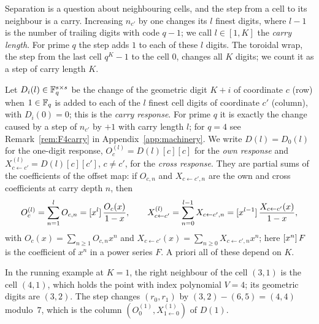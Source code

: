 Separation is a question about neighbouring cells, and the step from a cell to its neighbour is a carry. Increasing $n_{c'}$ by one changes its $l$ finest digits, where $l-1$ is the number of trailing digits with code $q-1$; we call $l\in[1,K]$ the \emph{carry length}. For prime $q$ the step adds $1$ to each of these $l$ digits. The toroidal wrap, the step from the last cell $q^K-1$ to the cell $0$, changes all $K$ digits; we count it as a step of carry length $K$.

Let $D_i(l)\in\mathbb{F}_q^{s\times s}$ be the change of the geometric digit $K+i$ of coordinate $c$ (row) when $1\in\mathbb{F}_q$ is added to each of the $l$ finest cell digits of coordinate $c'$ (column), with $D_i(0)=0$; this is the \emph{carry response}. For prime $q$ it is exactly the change caused by a step of $n_{c'}$ by $+1$ with carry length $l$; for $q=4$ see Remark~\ref{rem:F4carry} in Appendix~\ref{app:machinery}. We write $D(l)=D_0(l)$ for the one-digit response, $O_c^{(l)}=D(l)[c][c]$ for the \emph{own response} and $X_{c\leftarrow c'}^{(l)}=D(l)[c][c']$, $c\ne c'$, for the \emph{cross response}. They are partial sums of the coefficients of the offset map: if $O_{c,n}$ and $X_{c\leftarrow c',n}$ are the own and cross coefficients at carry depth $n$, then
\[
O_c^{(l)}=\sum_{n=1}^{l}O_{c,n}=[x^{l}]\,\frac{O_c(x)}{1-x},\qquad X_{c\leftarrow c'}^{(l)}=\sum_{n=0}^{l-1}X_{c\leftarrow c',n}=[x^{l-1}]\,\frac{X_{c\leftarrow c'}(x)}{1-x},
\]
with $O_c(x)=\sum_{n\ge1}O_{c,n}x^n$ and $X_{c\leftarrow c'}(x)=\sum_{n\ge0}X_{c\leftarrow c',n}x^n$; here $[x^{n}]\,F$ is the coefficient of $x^n$ in a power series $F$. A priori all of these depend on $K$.

In the running example at $K=1$, the right neighbour of the cell $(3,1)$ is the cell $(4,1)$, which holds the point with index polynomial $V=4$; its geometric digits are $(3,2)$. The step changes $(r_0,r_1)$ by $(3,2)-(6,5)=(4,4)$ modulo~$7$, which is the column $(O_0^{(1)},X^{(1)}_{1\leftarrow0})$ of $D(1)$.

